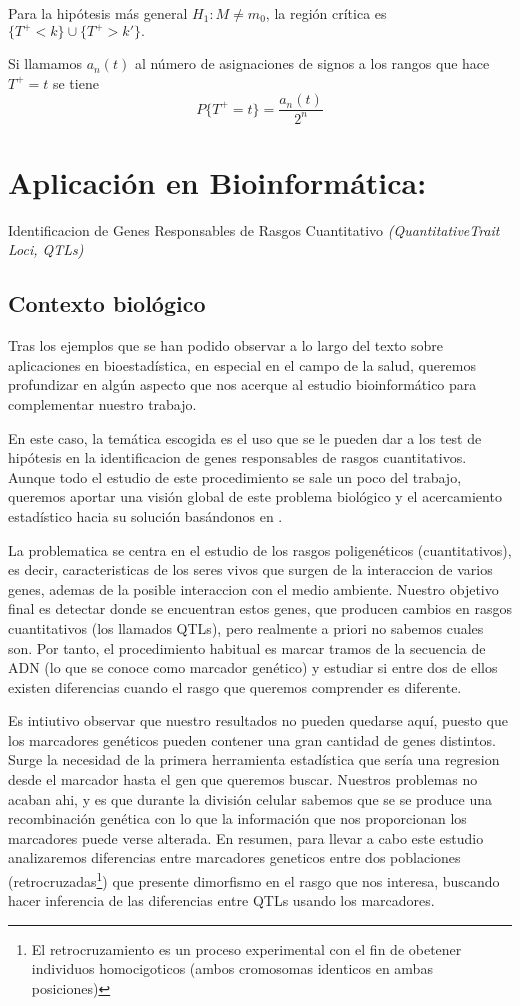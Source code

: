 \documentclass[a4paper,12pt]{article}
\begin{document}
Para la hipótesis más general $H_1: M \neq m_0$, la región crítica es $\{ T^+<k\}\cup\{T^+ >k'\}.$

Si llamamos $a_n(t)$ al número de asignaciones de signos a los rangos que hace $T^+=t$ se tiene $$P\{T^+ = t\}=\frac{a_n(t)}{2^n}$$ 





\section{Aplicación en Bioinformática:}
\large{Identificacion de Genes Responsables de Rasgos Cuantitativo \textit{(QuantitativeTrait Loci, QTLs)}}
\normalsize{}
\subsection{Contexto biológico}
Tras los ejemplos que se han podido observar a lo largo del texto sobre aplicaciones en bioestadística, en especial en el campo de la salud, queremos profundizar en algún aspecto que nos acerque al estudio bioinformático para complementar nuestro trabajo.

En este caso, la temática escogida es el uso que se le pueden dar a los test de hipótesis en la identificacion de genes responsables de rasgos cuantitativos. Aunque todo el estudio de este procedimiento se sale un poco del trabajo, queremos aportar una visión global de este problema biológico y el acercamiento estadístico hacia su solución basándonos en \cite{uned2}.

La problematica se centra en el estudio de los rasgos poligenéticos (cuantitativos), es decir, caracteristicas de los seres vivos que surgen de la interaccion de varios genes, ademas de la posible interaccion con el medio ambiente. 
Nuestro objetivo final es detectar donde se encuentran estos genes, que producen cambios en rasgos cuantitativos (los llamados QTLs), pero realmente a priori no sabemos cuales son. Por tanto, el procedimiento habitual es marcar tramos de la secuencia de ADN (lo que se conoce como marcador genético) y estudiar si entre dos de ellos existen diferencias cuando el rasgo que queremos comprender es diferente. 

Es intiutivo observar que nuestro resultados no pueden quedarse aquí, puesto que los marcadores genéticos pueden contener una gran cantidad de genes distintos. Surge la necesidad de la primera herramienta estadística que sería una regresion desde el marcador hasta el gen que queremos buscar. Nuestros problemas no acaban ahi, y es que durante la división celular sabemos que se se produce una recombinación genética con lo que la información que nos proporcionan los marcadores puede verse alterada. 
En resumen, para llevar a cabo este estudio analizaremos diferencias entre marcadores geneticos entre dos poblaciones (retrocruzadas\footnote{El retrocruzamiento es un proceso experimental con el fin de obetener individuos homocigoticos (ambos cromosomas identicos en ambas posiciones)}) que presente dimorfismo en el rasgo que nos interesa, buscando hacer inferencia de las diferencias entre QTLs usando los marcadores.
\end{document}
